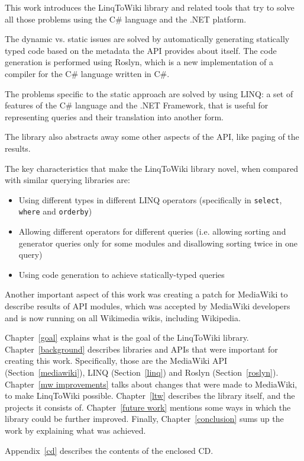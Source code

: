 \medskip

This work introduces the LinqToWiki library and related tools that try to solve all those problems
using the C\# language and the .NET platform.

The dynamic vs. static issues are solved by automatically generating statically typed
code based on the metadata the API provides about itself.
The code generation is performed using Roslyn,
which is a new implementation of a compiler for the C\# language written in C\#.

The problems specific to the static approach are solved by using \ac{LINQ}:
a set of features of the C\# language and the .NET Framework,
that is useful for representing queries and their translation into another form.

The library also abstracts away some other aspects of the \ac{API}, like paging of the results.


The key characteristics that make the LinqToWiki library novel, when compared with similar querying libraries are:

\begin{itemize}
\item Using different types in different LINQ operators
(specifically in \lstinline{select}, \lstinline{where} and \lstinline{orderby})
\item Allowing different operators for different queries
(i.e. allowing sorting and generator queries only for some modules and disallowing sorting twice in one query)
\item Using code generation to achieve statically-typed queries
\end{itemize}

Another important aspect of this work was creating a patch for MediaWiki to describe results of \ac{API} modules,
which was accepted by MediaWiki developers and is now running on all Wikimedia wikis, including Wikipedia.

Chapter~\ref{goal} explains what is the goal of the LinqToWiki library.
Chapter~\ref{background} describes libraries and \acp{API}
that were important for creating this work.
Specifically, those are the MediaWiki API (Section~\ref{mediawiki}),
LINQ (Section~\ref{linq}) and Roslyn (Section~\ref{roslyn}).
Chapter~\ref{mw improvements} talks about changes that were made to MediaWiki,
to make LinqToWiki possible.
Chapter~\ref{ltw} describes the library itself, and the projects it consists of.
Chapter~\ref{future work} mentions some ways in which the library could be further improved.
Finally, Chapter~\ref{conclusion} sums up the work by explaining what was achieved.

\medskip

Appendix~\ref{cd} describes the contents of the enclosed CD.